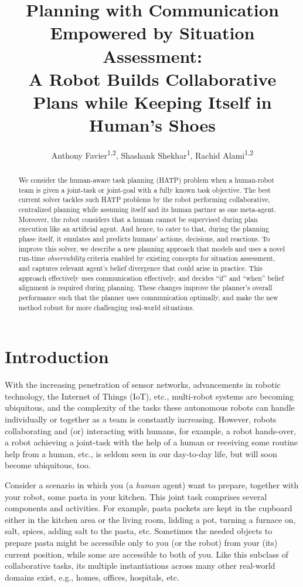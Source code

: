 \documentclass[letterpaper]{article} %
\title
{
Planning with Communication Empowered by Situation Assessment:
\\ 
A Robot Builds Collaborative Plans
while Keeping Itself in Human's Shoes 
}
\author{
    Anthony Favier\textsuperscript{\rm 1,2},
    Shashank Shekhar\textsuperscript{\rm 1},
    Rachid Alami\textsuperscript{\rm 1,2}
}
\begin{document}


\maketitle

\begin{abstract}
We consider the human-aware task planning (HATP) problem when a human-robot team is given a joint-task or joint-goal with a fully known task objective. 
The best current solver tackles such HATP problems by the robot performing collaborative, centralized planning while assuming itself and its human partner as one meta-agent. 
Moreover, the robot considers that a human cannot be supervised during plan execution like an artificial agent. And hence, to cater to that, during the planning phase itself, it emulates and predicts humans' actions, decisions, and reactions. 
To improve this solver, we describe a new planning approach that models and uses a novel run-time {\em observability} criteria enabled by existing concepts for situation assessment, and captures relevant agent's belief divergence that could arise in practice. 
This approach effectively uses communication effectively, and decides ``if'' and ``when'' belief alignment is required during planning. 
These changes improve the planner's overall performance such that the planner uses communication optimally, and make the new method robust for more challenging real-world situations.  
\end{abstract}

\section{Introduction}
With the increasing penetration of sensor networks, advancements in robotic technology, the Internet of Things (IoT), etc., multi-robot systems are becoming ubiquitous, and the complexity of the tasks these autonomous robots can handle individually or together as a team is constantly increasing.
However, robots collaborating and (or) interacting with humans, for example, a robot hands-over, a robot achieving a joint-task with the help of a human or receiving some routine help from a human, etc., is seldom seen in our day-to-day life, but will soon become ubiquitous, too.

Consider a scenario in which you (a \textit{human} agent) want to prepare, together with your robot, some pasta in your kitchen. This joint task comprises several components and activities. For example, pasta packets are kept in the cupboard either in the kitchen area or the living room, lidding a pot, turning a furnace on, salt, spices, adding salt to the pasta, etc. 
Sometimes the needed objects to prepare pasta might be accessible only to you (or the robot) from your (its) current position, while some are accessible to both of you. 
Like this subclass of collaborative tasks, its multiple instantiations across many other real-world domains exist, e.g., homes, offices, hospitals, etc.
\end{document}
